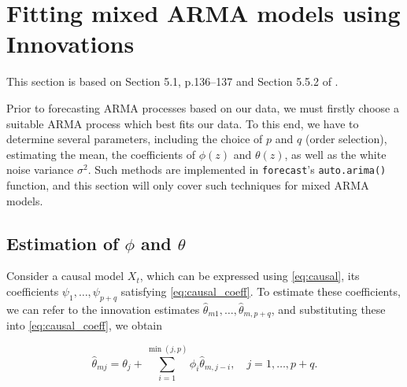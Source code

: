 \documentclass[a4paper, oneside]{discothesis}
\begin{document}
\section{Fitting mixed ARMA models using Innovations} \label{chap:mixedARMA}
This section is based on Section 5.1, p.136--137 and Section 5.5.2 of \cite{itsf}.

Prior to forecasting ARMA processes based on our data, we must firstly choose a suitable ARMA process which best fits our data. To this end, we have to determine several parameters, including the choice of $p$ and $q$ (order selection), estimating the mean, the coefficients of $\phi(z)$ and $\theta(z)$, as well as the white noise variance $\sigma^2$. Such methods are implemented in \texttt{forecast}'s \texttt{auto.arima()} function, and this section will only cover such techniques for mixed ARMA models.

\subsection{Estimation of $\phi$ and $\theta$}

Consider a causal model ${X_t}$, which can be expressed using \eqref{eq:causal}, its coefficients $\psi_1, \dots, \psi_{p+q}$ satisfying \eqref{eq:causal_coeff}. To estimate these coefficients, we can refer to the innovation estimates $\hat{\theta}_{m1}, \dots, \hat{\theta}_{m, p+q}$, and substituting these into \eqref{eq:causal_coeff}, we obtain

\begin{equation}\label{eq:causal_innov}
    \hat{\theta}_{mj} = \theta_j + \sum_{i=1}^{\min(j, p)} \phi_i \hat{\theta}_{m, j-i}, \quad j = 1, \dots, p+q.
\end{equation}
\end{document}
